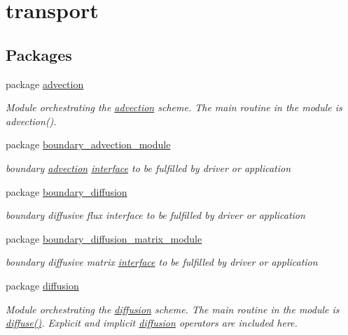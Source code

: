 \hypertarget{a00100}{
\section{transport}
\label{a00100}
}
\subsection*{Packages}
\begin{CompactItemize}
\item 
package \hyperlink{a00054}{advection}
\begin{CompactList}\small\item\em Module orchestrating the \hyperlink{a00054}{advection} scheme. The main routine in the module is advection(). \item\end{CompactList}

\item 
package \hyperlink{a00055}{boundary\_\-advection\_\-module}
\begin{CompactList}\small\item\em boundary \hyperlink{a00054}{advection} \hyperlink{a00003}{interface} to be fulfilled by driver or application \item\end{CompactList}

\item 
package \hyperlink{a00056}{boundary\_\-diffusion}
\begin{CompactList}\small\item\em boundary diffusive flux interface to be fulfilled by driver or application \item\end{CompactList}

\item 
package \hyperlink{a00057}{boundary\_\-diffusion\_\-matrix\_\-module}
\begin{CompactList}\small\item\em boundary diffusive matrix \hyperlink{a00002}{interface} to be fulfilled by driver or application \item\end{CompactList}

\item 
package \hyperlink{a00058}{diffusion}
\begin{CompactList}\small\item\em Module orchestrating the \hyperlink{a00058}{diffusion} scheme. The main routine in the module is \hyperlink{a00058_b108f04e81c5fda27fe18ee2aa18086c}{diffuse()}. Explicit and implicit \hyperlink{a00058}{diffusion} operators are included here. \item\end{CompactList}


\end{CompactItemize}
